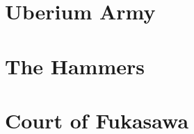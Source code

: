 



\maketitle


\section{Uberium Army}

\clearpage\section{The Hammers}

\clearpage\section{Court of Fukasawa}

